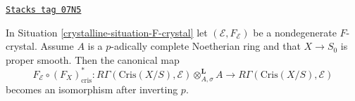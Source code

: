 \begin{theorem}
\label{crystalline-theorem-cohomology-F-crystal}
\href{https://stacks.math.columbia.edu/tag/07N5}{\texttt{Stacks tag 07N5}}

In Situation \ref{crystalline-situation-F-crystal} let $(\mathcal{E}, F_\mathcal{E})$
be a nondegenerate $F$-crystal. Assume $A$ is a $p$-adically complete
Noetherian ring and that $X \to S_0$ is proper smooth. Then
the canonical map
$$
F_\mathcal{E} \circ (F_X)_{\text{cris}}^* :
R\Gamma(\text{Cris}(X/S), \mathcal{E}) \otimes^\mathbf{L}_{A, \sigma} A
\longrightarrow
R\Gamma(\text{Cris}(X/S), \mathcal{E})
$$
becomes an isomorphism after inverting $p$.
\end{theorem}

